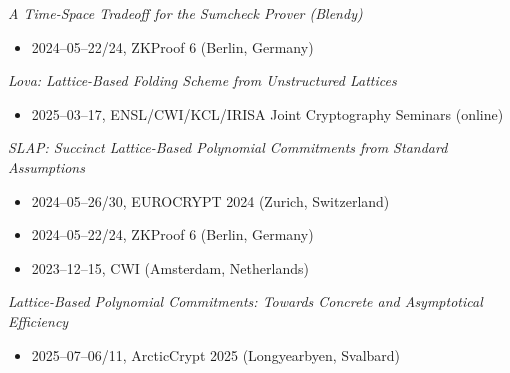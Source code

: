 \documentclass[11pt,a4paper]{article}
\begin{document}
\emph{A Time-Space Tradeoff for the Sumcheck Prover (Blendy)}
\begin{itemize}[leftmargin=2em]
  \item 2024--05--22/24, ZKProof 6 (Berlin, Germany)
\end{itemize}

\emph{Lova: Lattice-Based Folding Scheme from Unstructured Lattices}
\begin{itemize}[leftmargin=2em]
  \item 2025--03--17, ENSL/CWI/KCL/IRISA Joint Cryptography Seminars (online)
\end{itemize}

\emph{SLAP: Succinct Lattice-Based Polynomial Commitments from Standard Assumptions}
\begin{itemize}[leftmargin=2em]
  \item 2024--05--26/30, EUROCRYPT 2024 (Zurich, Switzerland)
  \item 2024--05--22/24, ZKProof 6 (Berlin, Germany)
  \item 2023--12--15, CWI (Amsterdam, Netherlands)
\end{itemize}

\emph{Lattice-Based Polynomial Commitments: Towards Concrete and Asymptotical Efficiency}
\begin{itemize}[leftmargin=2em]
  \item 2025--07--06/11, ArcticCrypt 2025 (Longyearbyen, Svalbard)
\end{itemize}
\end{document}
